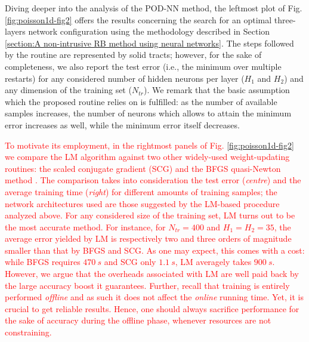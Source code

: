 \documentclass[longtitle]{elsarticle}
\numberwithin{equation}{section}
\theoremstyle{theorem}
\theoremstyle{definition}
\theoremstyle{remark}
\theoremstyle{proposition}
\numberwithin{figure}{section}
\begin{document}
		Diving deeper into the analysis of the POD-NN method, the leftmost plot of Fig. \ref{fig:poisson1d-fig2} offers the results concerning the search for an optimal three-layers network configuration using the methodology described in Section \ref{section:A non-intrusive RB method using neural networks}. The steps followed by the routine are represented by solid tracts; however, for the sake of completeness, we also report the test error (i.e., the minimum over multiple restarts) for any considered number of hidden neurons per layer ($H_1$ and $H_2$) and any dimension of the training set ($N_{tr}$). We remark that the basic assumption which the proposed routine relies on is fulfilled: as the number of available samples increases, the number of neurons which allows to attain the minimum error increases as well, while the minimum error itself decreases.
		
		\textcolor{red}{To motivate its employment, in the rightmost panels of Fig. \ref{fig:poisson1d-fig2} we compare the LM algorithm against two other widely-used weight-updating routines: the scaled conjugate gradient (SCG) \cite{Mol93} and the BFGS quasi-Newton method \cite{GMW81}. The comparison takes into consideration the test error (\emph{centre}) and the average training time (\emph{right}) for different amounts of training samples; the network architectures used are those suggested by the LM-based procedure analyzed above. For any considered size of the training set, LM turns out to be the most accurate method. For instance, for $N_{tr} = 400$ and $H_1 = H_2 = 35$, the average error yielded by LM is respectively two and three orders of magnitude smaller than that by BFGS and SCG. As one may expect, this comes with a cost: while BFGS requires $470~s$ and SCG only $1.1~s$, LM averagely takes $900~s$. However, we argue that the overheads associated with LM are well paid back by the large accuracy boost it guarantees. Further, recall that training is entirely performed \emph{offline} and as such it does not affect the \emph{online} running time. Yet, it is crucial to get reliable results. Hence, one should always sacrifice performance for the sake of accuracy during the offline phase, whenever resources are not constraining.}
\end{document}
